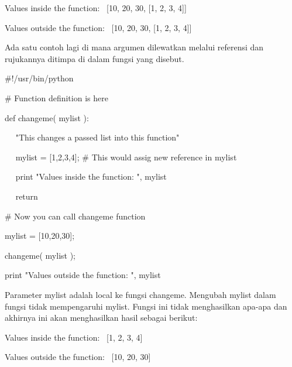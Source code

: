 \documentclass[a4paper,12pt]{report}
\begin{document}
 \par
\noindent 
 \hspace*{0.5in} Values inside the function:~ [10, 20, 30, [1, 2, 3, 4]] \par
\noindent 
 \hspace*{0.5in} Values outside the function:~ [10, 20, 30, [1, 2, 3, 4]] \par
\begin{adjustwidth}{0.03in}{0.03in}
Ada satu contoh lagi di mana argumen dilewatkan melalui referensi dan rujukannya ditimpa di dalam fungsi yang disebut.\end{adjustwidth}
 \par
\noindent 
 \hspace*{0.5in}  $  \#  $!/usr/bin/python \par
\vspace{12pt}
\noindent 
 \hspace*{0.5in}  $  \#  $ Function definition is here \par
\noindent 
 \hspace*{0.5in} def changeme( mylist ): \par
\noindent 
 \hspace*{0.5in} ~~ "This changes a passed list into this function" \par
\noindent 
 \hspace*{0.5in} ~~ mylist = [1,2,3,4];  $  \#  $ This would assig new reference in mylist \par
\noindent 
 \hspace*{0.5in} ~~ print "Values inside the function: ", mylist \par
\noindent 
 \hspace*{0.5in} ~~ return \par
\vspace{12pt}
\noindent 
 \hspace*{0.5in}  $  \#  $ Now you can call changeme function \par
\noindent 
 \hspace*{0.5in} mylist = [10,20,30]; \par
\noindent 
 \hspace*{0.5in} changeme( mylist ); \par
\noindent 
 \hspace*{0.5in} print "Values outside the function: ", mylist \par
\begin{adjustwidth}{0.03in}{0.03in}
Parameter mylist adalah local ke fungsi changeme. Mengubah mylist dalam fungsi tidak mempengaruhi mylist. Fungsi ini tidak menghasilkan apa-apa dan akhirnya ini akan menghasilkan hasil sebagai berikut:\end{adjustwidth}
 \par
\noindent 
 \hspace*{0.5in} Values inside the function:~ [1, 2, 3, 4] \par
\noindent 
 \hspace*{0.5in} Values outside the function:~ [10, 20, 30] \par
\vspace{20pt}
\end{document}
